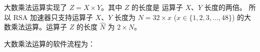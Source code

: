 \documentclass[main\_\_CN.tex]{subfiles}
\begin{document}
大数乘法运算实现了 \begin{math}Z = X \times Y\end{math}。其中 \begin{math}Z\end{math} 的长度是
运算子 \begin{math}X\end{math}、\begin{math}Y\end{math} 长度的两倍。
所以 RSA 加速器只支持运算子 $X$、$Y$ 长度为 \begin{math}N = 32 \times x\end{math} (\begin{math}x \in \{ 1, 2, 3, \dots, 48\} \end{math}) 的大数乘法运算。运算子 \begin{math}Z\end{math} 的长度 \begin{math}\hat{N}\end{math} 为 \begin{math}2 \times N\end{math}。


大数乘法运算的软件流程为：
\end{document}
